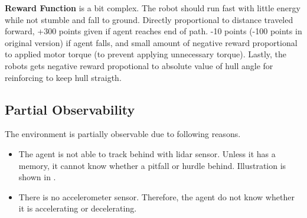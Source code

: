\textbf{Reward Function} is a bit complex. 
The robot should run fast with little energy while not stumble and fall to ground. 
Directly proportional to distance traveled forward, +300 points given if agent reaches end of path. 
-10 points (-100 points in original version) if agent falls, 
and small amount of negative reward proportional to applied motor torque (to prevent applying unnecessary torque). 
Lastly, the robots gets negative reward propotional to absolute value of hull angle for reinforcing to keep hull straigth. 

\subsection{Partial Observability}

The environment is partially observable due to following reasons.
\begin{itemize}
	\item The agent is not able to track behind with lidar sensor. 
	Unless it has a memory, it cannot know whether a pitfall or hurdle behind. 
	Illustration is shown in .
	\item There is no accelerometer sensor. 
	Therefore, the agent do not know whether it is accelerating or decelerating.
\end{itemize}

